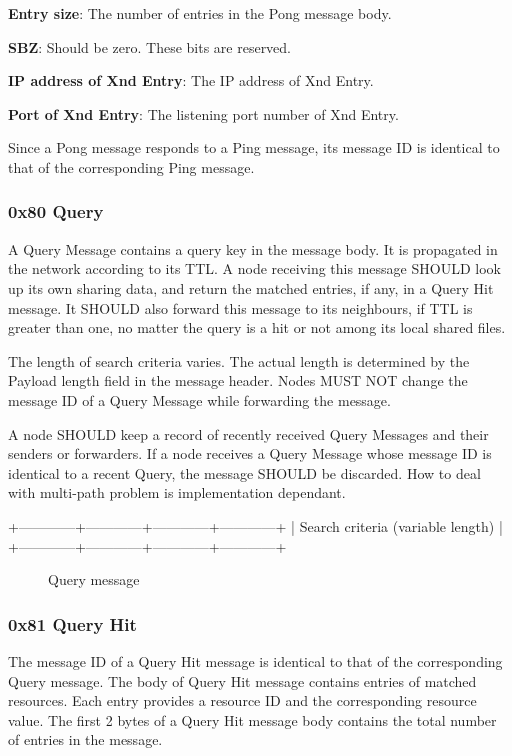 \documentclass[12pt, a4paper]{article}
\begin{document}
\textbf{Entry size}: The number of entries in the Pong message body.

\textbf{SBZ}: Should be zero. These bits are reserved.

\textbf{IP address of Xnd Entry}: The IP address of Xnd Entry.

\textbf{Port of Xnd Entry}: The listening port number of Xnd Entry.

\vskip 12pt

Since a Pong message responds to a Ping message, its message ID is identical to that of the corresponding Ping message.


\subsubsection{0x80 Query}
A Query Message contains a query key in the message body.
It is propagated in the network according to its TTL.
A node receiving this message SHOULD look up its own sharing data, and return the matched entries, if any, in a Query Hit message.
It SHOULD also forward this message to its neighbours, if TTL is greater than one, no matter the query is a hit or not among its local shared files.

The length of search criteria varies. The actual length is determined by the Payload length field in the message header.
Nodes MUST NOT change the message ID of a Query Message while forwarding the message.

A node SHOULD keep a record of recently received Query Messages and their senders or forwarders.
If a node receives a Query Message whose message ID is identical to a recent Query, the message SHOULD be discarded.
How to deal with multi-path problem is implementation dependant.

\begin{verbbox}
+------------+------------+------------+------------+
|     Search criteria (variable length)             |
+------------+------------+------------+------------+
\end{verbbox}

\begin{figure}[h!]
  \centering
  \theverbbox
  \label{query}
  \caption{Query message}
\end{figure}


\subsubsection{0x81 Query Hit}
The message ID of a Query Hit message is identical to that of the corresponding Query message.
The body of Query Hit message contains entries of matched resources.
Each entry provides a resource ID and the corresponding resource value.
The first 2 bytes of a Query Hit message body contains the total number of entries in the message.
\end{document}
